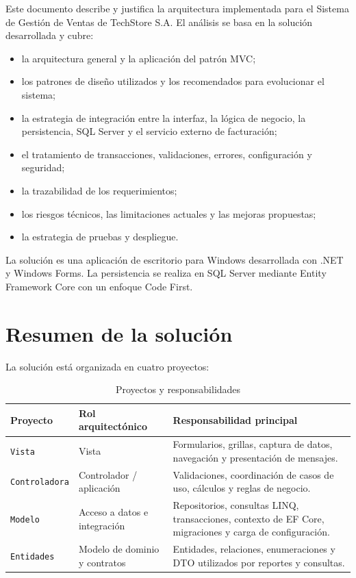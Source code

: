\documentclass[12pt,a4paper]{article}
\begin{document}
Este documento describe y justifica la arquitectura implementada para el
Sistema de Gestión de Ventas de TechStore S.A. El análisis se basa en la
solución desarrollada y cubre:

\begin{itemize}
    \item la arquitectura general y la aplicación del patrón MVC;
    \item los patrones de diseño utilizados y los recomendados para evolucionar
    el sistema;
    \item la estrategia de integración entre la interfaz, la lógica de negocio,
    la persistencia, SQL Server y el servicio externo de facturación;
    \item el tratamiento de transacciones, validaciones, errores, configuración
    y seguridad;
    \item la trazabilidad de los requerimientos;
    \item los riesgos técnicos, las limitaciones actuales y las mejoras
    propuestas;
    \item la estrategia de pruebas y despliegue.
\end{itemize}

La solución es una aplicación de escritorio para Windows desarrollada con
.NET y Windows Forms. La persistencia se realiza en SQL Server mediante Entity
Framework Core con un enfoque Code First.

\section{Resumen de la solución}

La solución está organizada en cuatro proyectos:

\begin{table}[H]
\centering
\caption{Proyectos y responsabilidades}
\begin{tabularx}{\textwidth}{L{2.8cm} L{3.5cm} Y}
\toprule
\textbf{Proyecto} & \textbf{Rol arquitectónico} &
\textbf{Responsabilidad principal} \\
\midrule
\texttt{Vista} & Vista &
Formularios, grillas, captura de datos, navegación y presentación de mensajes. \\
\texttt{Controladora} & Controlador / aplicación &
Validaciones, coordinación de casos de uso, cálculos y reglas de negocio. \\
\texttt{Modelo} & Acceso a datos e integración &
Repositorios, consultas LINQ, transacciones, contexto de EF Core, migraciones
y carga de configuración. \\
\texttt{Entidades} & Modelo de dominio y contratos &
Entidades, relaciones, enumeraciones y DTO utilizados por reportes y consultas. \\
\bottomrule
\end{tabularx}
\end{table}
\end{document}

